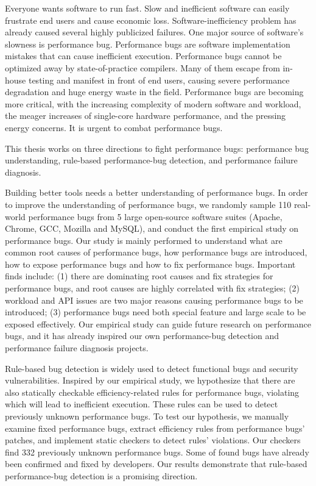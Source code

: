 Everyone wants software to run fast. 
Slow and inefficient software can easily frustrate end users and cause economic loss. 
Software-inefficiency problem has already caused several highly publicized failures. 
One major source of software's slowness is performance bug.
Performance bugs are software implementation mistakes that can cause inefficient execution. 
Performance bugs cannot be optimized away  by state-of-practice compilers. 
Many of them escape from in-house testing and manifest in front of end users, 
causing severe performance degradation and huge energy waste in the field. 
Performance bugs are becoming more critical, 
with the increasing complexity of modern software and workload,
the meager increases of single-core hardware performance, and the 
pressing energy concerns.
It is urgent to combat performance bugs.

This thesis works on three directions to fight performance bugs: 
performance bug understanding, rule-based performance-bug detection, 
and performance failure diagnosis. 

Building better tools needs a better understanding of performance bugs. 
In order to improve the understanding of performance bugs, 
we randomly sample 110 real-world performance bugs from 
5 large open-source software suites (Apache, Chrome, GCC, Mozilla and MySQL), 
and conduct the first empirical study on performance bugs. 
Our study is mainly performed to understand what are common root causes of performance bugs, 
how performance bugs are introduced, how to expose performance bugs and how to fix performance bugs. 
Important finds include: (1) there are dominating root causes and fix strategies for performance bugs, 
and root causes are highly correlated with fix strategies; 
(2) workload and API issues are two major reasons causing performance bugs to be introduced; 
(3) performance bugs need both special feature and large scale to be exposed effectively. 
Our empirical study can guide future research on performance bugs, 
and it has already inspired our own performance-bug detection 
and performance failure diagnosis projects. 

Rule-based bug detection is widely used to detect functional bugs and security vulnerabilities. 
Inspired by our empirical study, we hypothesize that there are also statically 
checkable efficiency-related rules for performance bugs, 
violating which will lead to inefficient execution. 
These rules can be used to detect previously unknown performance bugs. 
To test our hypothesis, we manually examine fixed performance bugs, 
extract efficiency rules from performance bugs' patches, and implement static checkers to detect rules' violations. 
Our checkers find 332 previously unknown performance bugs. 
Some of found bugs have already been confirmed and fixed by developers. 
Our results demonstrate that rule-based performance-bug detection is a promising direction. 


